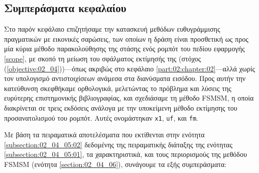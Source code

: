 \subsection{Συμπεράσματα κεφαλαίου}
\label{subsection:02_04_07:01}

Στο παρόν κεφάλαιο επιζητήσαμε την κατασκευή μεθόδων ευθυγράμμισης
πραγματικών με εικονικές σαρώσεις, των οποίων η δράση είναι προσθετική ως προς
μία κύρια μέθοδο παρακολούθησης της στάσης ενός ρομπότ του πεδίου εφαρμογής
\ref{scope}, με σκοπό τη μείωση του σφάλματος εκτίμησής της (στόχος
(\ref{objective:02_04}))---όπως ακριβώς στο κεφάλαιο
\ref{part:02:chapter:02}---αλλά χωρίς τον υπολογισμό αντιστοιχίσεων ανάμεσα στα
διανύσματα εισόδου. Προς αυτήν την κατεύθυνση σκεφθήκαμε ορθολογικά, μελετώντας
το πρόβλημα και λύσεις της ευρύτερης επιστημονικής βιβλιογραφίας, και
σχεδιάσαμε τη μέθοδο FSMSM, η οποία διακρίνεται σε τρεις εκδόσεις ανάλογα με
την υποκείμενη μέθοδο εκτίμησης του προσανατολισμού του ρομπότ. Αυτές
ονομάστηκαν \texttt{x1}, \texttt{uf}, και \texttt{fm}.

Με βάση τα πειραματικά αποτελέσματα που εκτίθενται στην ενότητα
\ref{subsection:02_04_05:02} δεδομένης της πειραματικής διάταξης της ενότητας
\ref{subsection:02_04_05:01}, τα χαρακτηριστικά, και τους περιορισμούς της
μεθόδου FSMSM (ενότητα \ref{section:02_04_06}), συνάγουμε τα εξής συμπεράσματα:

